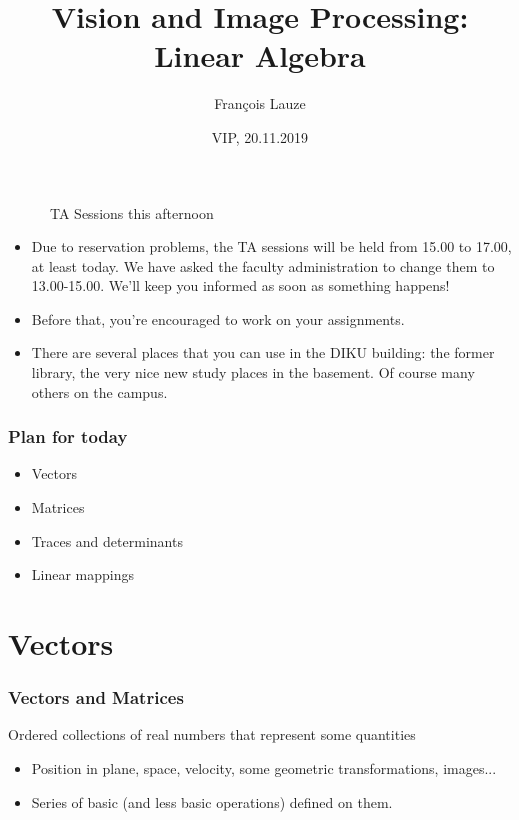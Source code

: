 \documentclass[8pt]{beamer}
\title{Vision and Image Processing:\\ Linear Algebra}
\author[F.~Lauze] %
{Fran{\c c}ois Lauze}
\institute[DIKU] %
{
  Department of Computer Science\\
  University of Copenhagen
}
\date[2019-19 B2]{VIP, 20.11.2019}
\begin{document}
\maketitle








\begin{frame}{\textdbend ~~~~~~TA Sessions this afternoon}
  \begin{itemize}
  \item Due to reservation problems, the TA sessions will be held from 15.00 to 17.00, at least today. We have asked the  faculty administration to change them to 13.00-15.00. We'll keep you informed as soon as something happens!
  \item Before that, you're encouraged to work on your assignments.
  \item There are several places that you can use in the DIKU building: the former
    library, the very nice new study places in the basement. Of course many others on the
    campus.
  \end{itemize}
 
  
\end{frame}

\begin{frame}
  \frametitle{Plan for today}
  \begin{itemize}
  \item Vectors
  \item Matrices
  \item Traces and determinants
  \item Linear mappings
  \end{itemize}
\end{frame}


\section{Vectors}

\begin{frame}
  \frametitle{Vectors and Matrices}
  Ordered collections of real numbers that represent some quantities
  \begin{itemize}
  \item Position in plane, space, velocity, some geometric transformations, images...
  \item Series of basic (and less basic operations)  defined on them.
  \end{itemize}
\end{frame}
\end{document}
